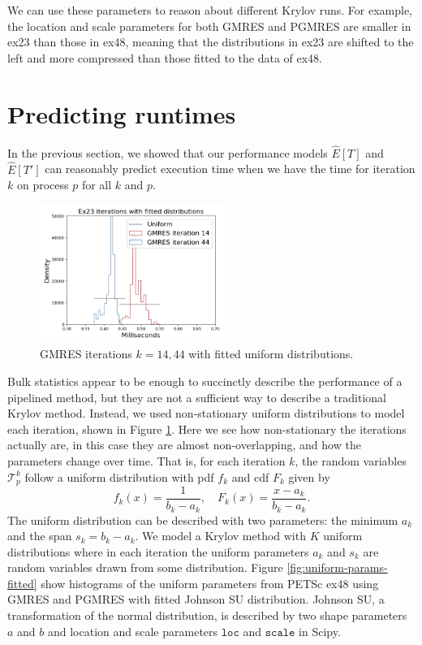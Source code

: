 \documentclass[num-refs]{wiley-article}
\begin{document}
We can use these parameters to reason about different Krylov runs.
For example, the location and scale parameters for both GMRES and PGMRES are smaller in ex23 than those in ex48, meaning that the distributions in ex23 are shifted to the left and more compressed than those fitted to the data of ex48.
\fi


\section{Predicting runtimes}\label{sec:performance-estimates}

In the previous section, we showed that our performance models $\widehat{E}[T]$ and $\widehat{E}[T']$ can reasonably predict execution time when we have the time for iteration $k$ on process $p$ for all $k$ and $p$. 

\begin{figure}[b]
\centering
\includegraphics[width=6cm]{../plots/GMRES_ex23_8192_1000000__stationary_in_t_with_uniform_14_44.png}
\caption{GMRES  iterations $k = 14, 44$ with fitted uniform distributions.} \label{fig:iterations-with-fitted-uniform}
\end{figure}

Bulk statistics appear to be enough to succinctly describe the performance of a pipelined method, but they are not a sufficient way to describe a traditional Krylov method. Instead, we used non-stationary uniform distributions to model each iteration, shown in Figure \ref{fig:iterations-with-fitted-uniform}.
Here we see how non-stationary the iterations actually are, in this case they are almost non-overlapping, and how the parameters change over time. 
That is, for each iteration $k$, the random variables $\mathcal{T}_p^k$ follow a uniform distribution with pdf $f_k$ and cdf $F_k$ given by
\begin{equation} \label{eq:uniform}
f_k(x) = \frac{1}{b_k - a_k}, \quad F_k(x) = \frac{x-a_k}{b_k-a_k}.
\end{equation}
The uniform distribution can be described with two parameters: the minimum $a_k$ and the span $s_k = b_k - a_k$. We model a Krylov method with $K$ uniform distributions
where in each iteration the uniform parameters $a_k$ and $s_k$ are random variables drawn from some distribution. 
Figure \ref{fig:uniform-params-fitted} show histograms of the uniform parameters from  PETSc ex48 using GMRES and PGMRES with fitted Johnson SU distribution.
Johnson SU, a transformation of the normal distribution, is described by two shape parameters $a$ and $b$ and location and scale parameters ${\texttt{loc}}$ and ${\texttt{scale}}$ in Scipy.  
\end{document}
